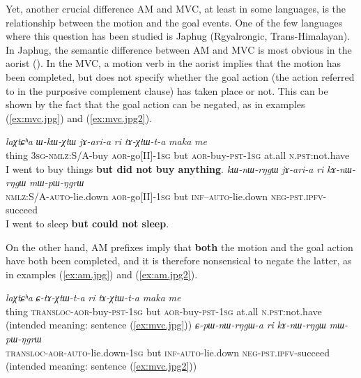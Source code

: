 \documentclass{article}
\newcommand{\ipa}[1]{\textit{{\phon\mbox{#1}}}} %
\begin{document}
Yet, another crucial difference AM and MVC, at least in some languages, is the relationship between the motion and the goal events. One of the few languages where this question has been studied is Japhug (Rgyalrongic, Trans-Himalayan). In Japhug, the semantic difference between AM and MVC is most obvious in the aorist (\citealt[203]{jacques13harmonization}). In the MVC, a motion verb in the aorist implies that the motion has been completed, but does not specify whether the goal action (the action referred to in the purposive complement clause) has taken place or not. This can be shown by the fact that the goal action can be negated, as in examples (\ref{ex:mvc.jpg}) and  (\ref{ex:mvc.jpg2}).

 \begin{exe}
\ex \label{ex:mvc.jpg}
\gll  \ipa{laχtɕʰa} \ipa{ɯ-kɯ-χtɯ} \ipa{jɤ-ari-a}  \ipa{ri} \ipa{tɤ-χtɯ-t-a} \ipa{maka} \ipa{me} \\
thing \textsc{3sg}-\textsc{nmlz}:S/A-buy \textsc{aor}-go[II]-\textsc{1sg} but \textsc{aor}-buy-\textsc{pst-1sg} at.all \textsc{n.pst}:not.have\\
\glt  I went to buy things \textbf{but did not buy anything}.
\ex \label{ex:mvc.jpg2}
\gll  \ipa{kɯ-nɯ-rŋgɯ}  	\ipa{jɤ-ari-a}  	\ipa{ri}  	\ipa{kɤ-nɯ-rŋgɯ}  	\ipa{mɯ-pɯ-ŋgrɯ}  	\\  
\textsc{nmlz}:S/A-\textsc{auto}-lie.down 	\textsc{aor}-go[II]-\textsc{1sg} but	\textsc{inf}--\textsc{auto}-lie.down 	\textsc{neg-pst.ipfv}-succeed \\
\glt  I went to sleep \textbf{but could not sleep}.
  \end{exe}
  
On the other hand, AM prefixes imply that \textbf{both} the motion and the goal action have both been completed, and it is therefore nonsensical to negate the latter, as in examples (\ref{ex:am.jpg}) and (\ref{ex:am.jpg2}).

 \begin{exe}
\ex \label{ex:am.jpg}
\gll  *\ipa{laχtɕʰa} \ipa{ɕ-tɤ-χtɯ-t-a}  \ipa{ri} \ipa{tɤ-χtɯ-t-a} \ipa{maka} \ipa{me} \\
thing \textsc{transloc}-\textsc{aor}-buy-\textsc{pst-1sg} but \textsc{aor}-buy-\textsc{pst-1sg}  at.all \textsc{n.pst}:not.have\\
\glt  (intended meaning: sentence (\ref{ex:mvc.jpg}))
\ex \label{ex:am.jpg2}
\gll  *\ipa{ɕ-pɯ-nɯ-rŋgɯ-a}  	\ipa{ri}  	\ipa{kɤ-nɯ-rŋgɯ}  	\ipa{mɯ-pɯ-ŋgrɯ}  \\
\textsc{transloc-aor-auto}-lie.down-\textsc{1sg} but	\textsc{inf-auto}-lie.down 	\textsc{neg-pst.ipfv}-succeed \\
\glt  (intended meaning: sentence (\ref{ex:mvc.jpg2}))
\end{exe}  
\end{document}
